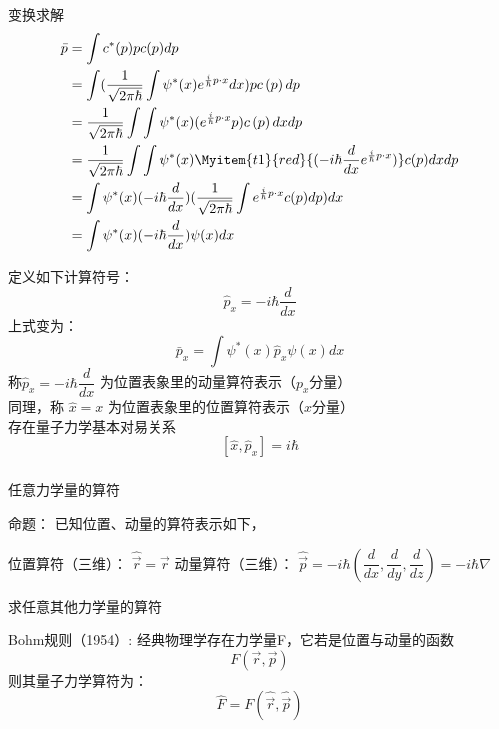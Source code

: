 \begin{frame}
变换求解
\begin{equation*}
    \begin{split}
        \bar{p}&=\int c^{*}(p) p c(p) d p \\  
        &=\int (\frac{1}{\sqrt{2 \pi \hbar}} \int \psi^{*}(x) e^{\frac{i}{\hbar} p\cdot x} d x) p c\left(p\right) d p \\
        &=\frac{1}{\sqrt{2 \pi \hbar}} \int \int \psi^{*}(x) (e^{\frac{i}{\hbar} p\cdot x}  p) c\left(p\right) d xd p \\
        &=\frac{1}{\sqrt{2 \pi \hbar}} \int \int \psi^{*}(x) \Myitem{t1}{red}{(-i\hbar\frac{d}{d x} e^{\frac{i}{\hbar} p\cdot x})} c(p) d xd p \\
        &=\int \psi^{*}(x) (-i\hbar\frac{d}{d x}) (\frac{1}{\sqrt{2 \pi \hbar}} \int e^{\frac{i}{\hbar} p\cdot x} c(p) d p)  d x\\
        &=\int \psi^{*}(x) (-i\hbar\frac{d}{d x}) \psi(x)  d x\\
     \end{split}
\end{equation*}  
\end{frame} 

\begin{frame}
定义如下计算符号：
$$ \boxed{\hat{p}_x= -i\hbar\frac{d}{d x}} $$ 
上式变为：         
$$\boxed{\bar{p}_x=\int \psi^{*}(x) \hat{p}_x \psi(x) d x} $$
称$ \hat{p}_x= -i\hbar\dfrac{d}{d x} $ 为位置表象里的动量算符表示（$p_x$分量）\\
同理，称 $\hat{x}= x $ 为位置表象里的位置算符表示（$x$分量）\\ \vspace{0.3em}
存在量子力学基本对易关系 \[ [\hat{x},\hat{p}_x]=i\hbar\] 
\end{frame}

\begin{frame} 
    \frametitle{}
    {\Bullet} 任意力学量的算符
    \begin{tcolorbox1}{命题：}
    已知位置、动量的算符表示如下，
    \begin{itemize}
        \Item  位置算符（三维）： $ \hat{\vec{r}} =\vec{r} $
        \Item  动量算符（三维）： $ \hat{\vec{p}} =-i\hbar(\dfrac{d}{d x}, \dfrac{d}{d y} , \dfrac{d}{d z})=-i\hbar \nabla $
    \end{itemize}
    求任意其他力学量的算符
    \end{tcolorbox1}
    \alert{Bohm规则（1954）:} 经典物理学存在力学量F，它若是位置与动量的函数
    \[F(\vec{r},\vec{p})\]
    则其量子力学算符为：
    \[\hat{F}=F(\hat{\vec{r}},\hat{\vec{p}})\]
\end{frame} 

